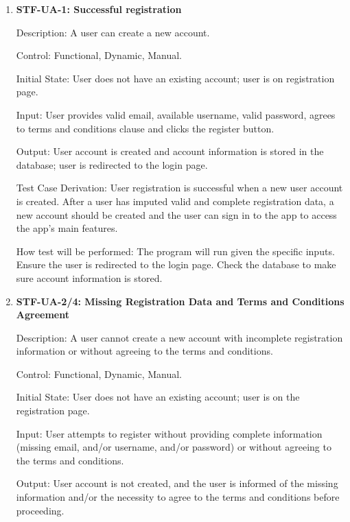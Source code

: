 \documentclass[12pt, titlepage]{article}
\begin{document}
    \begin{enumerate}

        \item{\textbf{STF-UA-1: Successful registration}\\}

        Description: A user can create a new account.

        Control: Functional, Dynamic, Manual.

        Initial State: User does not have an existing account; user is on registration page.

        Input: User provides valid email, available username, valid password, agrees to terms and conditions clause and clicks the register button.

        Output: User account is created and account information is stored in the database; user is redirected to the login page.

        Test Case Derivation: User registration is successful when a new user account is created. After a user has imputed valid and complete registration data, a new account should be created and the user can sign in to the app to access the app’s main features.

        How test will be performed: The program will run given the specific inputs. Ensure the user is redirected to the login page. Check the database to make sure account information is stored.

        \item{\textbf{STF-UA-2/4: Missing Registration Data and Terms and Conditions Agreement}\\}
        
        Description: A user cannot create a new account with incomplete registration information or without agreeing to the terms and conditions.
        
        Control: Functional, Dynamic, Manual.
        
        Initial State: User does not have an existing account; user is on the registration page.
        
        Input: User attempts to register without providing complete information (missing email, and/or username, and/or password) or without agreeing to the terms and conditions.
        
        Output: User account is not created, and the user is informed of the missing information and/or the necessity to agree to the terms and conditions before proceeding.
        

\end{enumerate}
\end{document}
